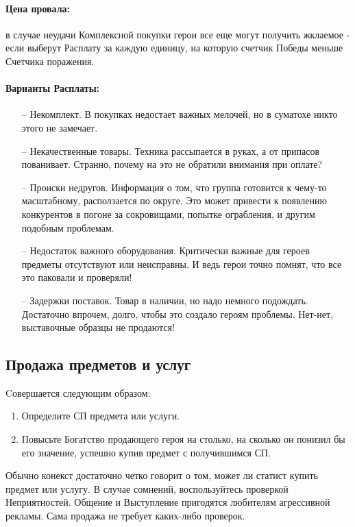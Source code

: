 \paragraph{Цена провала:} в случае неудачи Комплексной покупки герои  все еще могут получить жклаемое - если выберут Расплату за каждую единицу, на которую счетчик Победы меньше Счетчика поражения.
\paragraph{Варианты Расплаты:}
\begin{itemize}
    \item[--] Некомплект. В покупках недостает важных мелочей, но в суматохе никто этого не замечает.
    \item[--] Некачественные товары. Техника рассыпается в руках, а от припасов пованивает. Странно, почему на это не обратили внимания при оплате?
    \item[--] Происки недругов. Информация о том, что группа готовится к чему-то масштабному, расползается по округе. Это может привести к появлению конкурентов в погоне за сокровищами, попытке ограбления, и другим подобным проблемам.
    \item[--] Недостаток важного оборудования. Критически важные для героев предметы отсутствуют или неисправны. И ведь герои точно помнят, что все это паковали и проверяли!
    \item[--] Задержки поставок. Товар в наличии, но надо немного подождать. Достаточно впрочем, долго, чтобы это создало героям проблемы. Нет-нет, выставочные образцы не продаются!
\end{itemize}

\subsection{Продажа предметов и услуг}
Cовершается следующим образом: 
\begin{enumerate}
    \item Определите СП предмета или услуги.
    \item Повысьте Богатство продающего героя на столько, на сколько он понизил бы его значение, успешно купив предмет с получившимся СП.
\end{enumerate}
\begin{tcolorbox}
    Обычно конекст достаточно четко говорит о том, может ли статист купить предмет или услугу. В случае сомнений, воспользуйтесь проверкой Неприятностей. Общение и Выступление пригодятся любителям агрессивной рекламы. Сама продажа не требует каких-либо проверок.
\end{tcolorbox}
